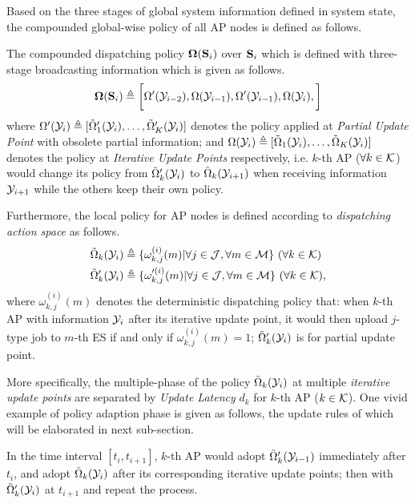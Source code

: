 Based on the three stages of global system information defined in system state, the compounded global-wise policy of all AP nodes is defined as follows.
\begin{definition}
    The compounded dispatching policy $\boldsymbol{\Omega}(\mathbf{S}_{i})$ over $\mathbf{S}_{i}$ which is defined with three-stage broadcasting information which is given as follows.
    \begin{align}
        \boldsymbol{\Omega}(\mathbf{S}_{i}) \triangleq \bigg[
            \Omega'(\mathcal{Y}_{i-2}), \Omega(\mathcal{Y}_{i-1}), \Omega'(\mathcal{Y}_{i-1}), \Omega(\mathcal{Y}_{i}),
        \bigg]
    \end{align}
    where $\Omega'(\mathcal{Y}_i) \triangleq [\tilde{\Omega}'_{1}(\mathcal{Y}_i), \dots, \tilde{\Omega}'_{K}(\mathcal{Y}_i)]$ denotes the policy applied at \emph{Partial Update Point} with obsolete partial information; and $\Omega(\mathcal{Y}_i) \triangleq [\tilde{\Omega}_{1}(\mathcal{Y}_i), \dots, \tilde{\Omega}_{K}(\mathcal{Y}_i)]$ denotes the policy at \emph{Iterative Update Points} respectively, i.e. $k$-th AP ($\forall k\in\mathcal{K}$) would change its policy from $\tilde{\Omega}_{k}'(\mathcal{Y}_i)$ to $\tilde{\Omega}_{k}(\mathcal{Y}_{i+1})$ when receiving information $\mathcal{Y}_{i+1}$ while the others keep their own policy.
            
    Furthermore, the local policy for AP nodes is defined according to \emph{dispatching action space} as follows.
    \begin{align}
        &\tilde{\Omega}_{k}(\mathcal{Y}_{i}) \triangleq \{\omega^{(i)}_{k,j}(m)|\forall j\in\mathcal{J}, \forall m\in\mathcal{M}\}
        ~(\forall k\in\mathcal{K})
        \\
        &\tilde{\Omega}'_{k}(\mathcal{Y}_{i}) \triangleq \{\omega'^{(i)}_{k,j}(m)|\forall j\in\mathcal{J}, \forall m\in\mathcal{M}\}
        ~(\forall k\in\mathcal{K}),
    \end{align}
    where $\omega^{(i)}_{k,j}(m)$ denotes the deterministic dispatching policy that: when $k$-th AP with information $\mathcal{Y}_{i}$ after its iterative update point, it would then upload $j$-type job to $m$-th ES if and only if $\omega^{(i)}_{k,j}(m)=1$; $\tilde{\Omega}'_{k}(\mathcal{Y}_i)$ is for partial update point.
\end{definition}

More specifically, the multiple-phase of the policy $\tilde{\Omega}_k(\mathcal{Y}_i)$ at multiple \emph{iterative update points} are separated by \emph{Update Latency} $d_{k}$ for $k$-th AP ($k\in\mathcal{K}$). One vivid example of policy adaption phase is given as follows, the update rules of which will be elaborated in next sub-section.
\begin{example}
    In the time interval $[t_{i}, t_{i+1}]$, $k$-th AP would adopt $\tilde{\Omega}_{k}'(\mathcal{Y}_{i-1})$ immediately after $t_i$, and adopt $\tilde{\Omega}_{k}(\mathcal{Y}_{i})$ after its corresponding iterative update points; then with $\tilde{\Omega}_{k}'(\mathcal{Y}_{i})$ at $t_{i+1}$ and repeat the process.
\end{example}

